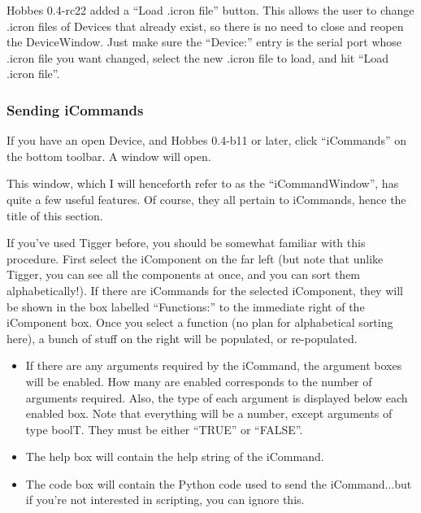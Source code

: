 Hobbes 0.4-rc22 added a ``Load .icron file'' button. This allows the user to change .icron files of Devices that already exist, so there is no need to close and reopen the DeviceWindow. Just make sure the ``Device:'' entry is the serial port whose .icron file you want changed, select the new .icron file to load, and hit ``Load .icron file''.



%
%
\subsubsection{Sending iCommands}
\label{3.3.1}

If you have an open Device, and Hobbes 0.4-b11 or later, click ``iCommands'' on the bottom toolbar. A window will open.

This window, which I will henceforth refer to as the ``iCommandWindow'', has quite a few useful features. Of course, they all pertain to iCommands, hence the title of this section.

If you've used Tigger before, you should be somewhat familiar with this procedure. First select the iComponent on the far left (but note that unlike Tigger, you can see all the components at once, and you can sort them alphabetically!). If there are iCommands for the selected iComponent, they will be shown in the box labelled ``Functions:'' to the immediate right of the iComponent box. Once you select a function (no plan for alphabetical sorting here), a bunch of stuff on the right will be populated, or re-populated.
\begin{itemize}
\item If there are any arguments required by the iCommand, the argument boxes will be enabled. How many are enabled corresponds to the number of arguments required. Also, the type of each argument is displayed below each enabled box. Note that everything will be a number, except arguments of type boolT. They must be either ``TRUE'' or ``FALSE''.
\item The help box will contain the help string of the iCommand.
\item The code box will contain the Python code used to send the iCommand...but if you're not interested in scripting, you can ignore this.
\end{itemize}

